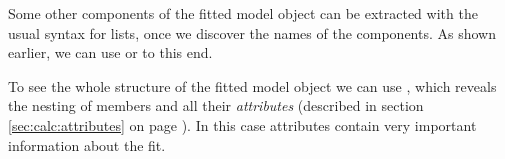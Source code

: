 \documentclass[krantz2]{krantz}\usepackage{knitr}%
\begin{document}
\begin{playground}
\begin{knitrout}\footnotesize
{}\color{fgcolor}\begin{kframe}
\begin{alltt}
    \hlstd{=} \hlstd{,}  \hlstd{=} \hlstd{)}
\end{alltt}
\end{kframe}
\end{knitrout}

Some other components of the fitted model object can be extracted with the usual syntax for lists, once we discover the names of the components. As shown earlier, we can use  or  to this end.

\begin{knitrout}\footnotesize
{}\color{fgcolor}\begin{kframe}
\begin{alltt}
\end{alltt}
\end{kframe}
\end{knitrout}

\begin{knitrout}\footnotesize
{}\color{fgcolor}\begin{kframe}
\begin{alltt}
\hlopt{$}
\end{alltt}
\end{kframe}
\end{knitrout}

To see the whole structure of the fitted model object we can use , which reveals the nesting of members and all their \emph{attributes} (described in section \ref{sec:calc:attributes} on page \pageref{sec:calc:attributes}). In this case attributes contain very important information about the fit.

\begin{knitrout}\footnotesize
{}\color{fgcolor}\begin{kframe}
\begin{alltt}
  \hlstd{=} \hlstd{)}
\end{alltt}
\end{kframe}
\end{knitrout}

\end{playground}
\end{document}
